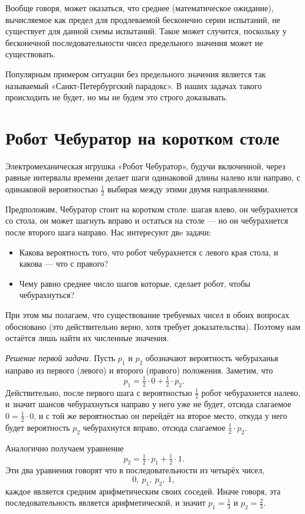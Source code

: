 \documentclass{article}
\begin{document}
Вообще говоря, может оказаться, что среднее (математическое ожидание), вычисляемое как предел для продлеваемой бесконечно серии испытаний, не существует для данной схемы испытаний.
Такое может случится, поскольку у бесконечной последовательности чисел предельного значения может не существовать. 

Популярным примером ситуации без предельного значения является так называемый «Санкт-Петербургский парадокс». 
В наших задачах такого происходить не будет,
но мы не будем это строго доказывать.

\section{Робот Чебуратор на коротком столе} 

Электромеханическая игрушка «Робот Чебуратор», 
будучи включенной, через равные интервалы времени делает шаги одинаковой длины налево или направо, с одинаковой вероятностью $\tfrac12$ выбирая между этими двумя направлениями. 

Предположим, Чебуратор стоит на коротком столе:
шагая влево, он чебурахнется со стола,
он может шагнуть вправо и остаться на столе --- но он чебурахнется после второго шага направо.
Нас интересуют двe задачи:
\begin{itemize}
\item Какова вероятность того, что робот чебурахнется с левого края стола, и какова --- что с правого?
\item Чему равно среднее число шагов которые, сделает робот, чтобы чебурахнуться?
\end{itemize}
При этом мы полагаем, что существование требуемых чисел в обоих вопросах обосновано
(это действительно верно, хотя требует доказательства).
Поэтому нам остаётся лишь найти их
численные значения. 

\medskip
\noindent\textit{Решение первой задачи.}
Пусть $p_1$ и $p_2$ обозначают вероятность чебураханья направо из первого (левого) и второго (правого) положения. 
Заметим, что
\[p_1=\tfrac12\cdot0+\tfrac12\cdot p_2.\]
Действительно, после первого шага 
с вероятностью $\tfrac12$ робот чебурахнется налево,
и значит шансов чебурахнуться направо у него уже не будет, 
отсюда слагаемое $0=\tfrac12\cdot0$,
и с той же вероятностью он перейдёт на второе место,
откуда у него будет вероятность $p_2$ чебурахнутся вправо,
отсюда слагаемое $\tfrac12\cdot p_2$.

Аналогично получаем уравнение 
\[p_2=\tfrac12\cdot p_1+\tfrac12\cdot 1.\]
Эти два уравнения говорят что в последовательности из четырёх чисел, 
\[0,\  p_1,\  p_2,\ 1,\]
каждое является средним арифметическим своих соседей.
Иначе говоря, эта последовательность является арифметической, 
и значит $p_1=\tfrac13$ и $p_2=\tfrac23$.
\end{document}
